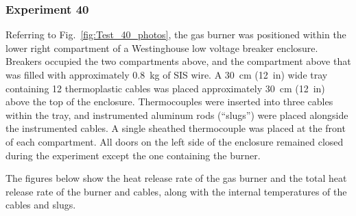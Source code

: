 \clearpage

\subsubsection{Experiment 40}

Referring to Fig.~\ref{fig:Test_40_photos}, the gas burner was positioned within the lower right compartment of a Westinghouse low voltage breaker enclosure. Breakers occupied the two compartments above, and the compartment above that was filled with approximately 0.8~kg of SIS wire. A 30~cm (12~in) wide tray containing 12 thermoplastic cables was placed approximately 30~cm (12~in) above the top of the enclosure. Thermocouples were inserted into three cables within the tray, and instrumented aluminum rods (``slugs'') were placed alongside the instrumented cables. A single sheathed thermocouple was placed at the front of each compartment. All doors on the left side of the enclosure remained closed during the experiment except the one containing the burner.

The figures below show the heat release rate of the gas burner and the total heat release rate of the burner and cables, along with the internal temperatures of the cables and slugs.

